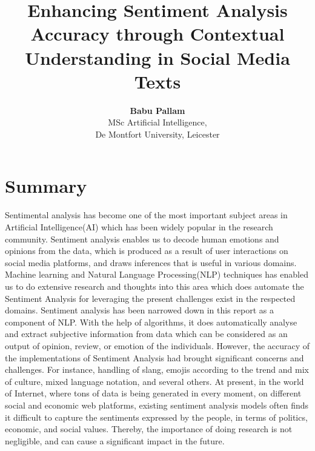 \documentclass[a4paper,onecolumn,11pt]{article}
\begin{document}
\title{Enhancing Sentiment Analysis Accuracy through Contextual Understanding in Social Media Texts}
\author{\textbf{Babu Pallam}\\
MSc Artificial Intelligence,\\ De Montfort University, Leicester
}%
\maketitle
\thispagestyle{empty}
\section{Summary}
Sentimental analysis has become one of the most important subject areas in Artificial Intelligence(AI) which has been widely popular in the research community. Sentiment analysis enables us to decode human emotions and opinions from the data, which is produced as a result of user interactions on social media platforms, and draws inferences that is useful in various domains. Machine learning and Natural Language Processing(NLP) techniques has enabled us to do extensive research and thoughts into this area which does automate the Sentiment Analysis for leveraging the present challenges exist in the respected domains. Sentiment analysis has been narrowed down in this report as a component of NLP. With the help of algorithms, it does automatically analyse and extract subjective information from data which can be considered as an output of opinion, review, or emotion of the individuals. 
However, the accuracy of the implementations of Sentiment Analysis had brought significant concerns and challenges. For instance, handling of slang, emojis according to the trend and mix of culture, mixed language notation, and several others. At present, in the world of Internet, where tons of data is being generated in every moment, on different social and economic web platforms, existing sentiment analysis models often finds it difficult to capture the sentiments expressed by the people, in terms of politics, economic, and social values. Thereby, the importance of doing research is not negligible, and can cause a significant impact in the future.
\end{document}
